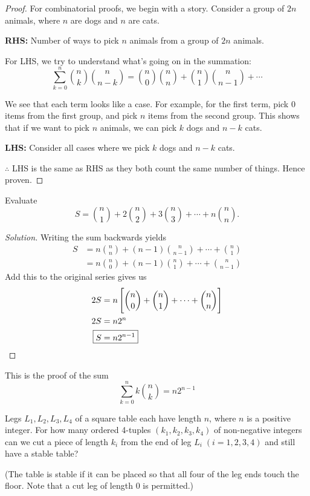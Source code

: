 \begin{proof}
For combinatorial proofs, we begin with a story. Consider a group of $2n$ animals, where $n$ are dogs and $n$ are cats.

\textbf{RHS:} Number of ways to pick $n$ animals from a group of $2n$ animals.

For LHS, we try to understand what's going on in the summation:
\[ \sum_{k=0}^{n} \binom{n}{k}\binom{n}{n-k} = \binom{n}{0}\binom{n}{n} + \binom{n}{1}\binom{n}{n-1} + \cdots \]

We see that each term looks like a case. For example, for the first term, pick $0$ items from the first group, and pick $n$ items from the second group. This shows that if we want to pick $n$ animals, we can pick $k$ dogs and $n-k$ cats.

\textbf{LHS:} Consider all cases where we pick $k$ dogs and $n-k$ cats.

$\therefore$ LHS is the same as RHS as they both count the same number of things. Hence proven.
\end{proof}
\pagebreak

\begin{prbm} 
Evaluate 
\[ S = {n \choose 1} + 2 {n \choose 2} + 3 {n \choose 3} + \cdots + n {n \choose n}. \] 
\end{prbm}

\begin{proof}[Solution]
Writing the sum backwards yields 
\begin{align*} 
S &= n {n \choose n} + (n-1) {n \choose n-1} + \cdots + {n \choose 1} \\&= n {n \choose 0} + (n-1) {n \choose 1} + \cdots + {n \choose n-1} 
\end{align*} 
Add this to the original series gives us 
\begin{align*}
2S &= n \left[{n \choose 0} + {n \choose 1} + \cdots + {n \choose n}\right]\\ 
2S &= n 2^n \\
\Aboxed{S &= n 2^{n-1}}
\end{align*}
\end{proof}
This is the proof of the sum
\[ \sum_{k=0}^{n} k \binom{n}{k} = n 2^{n-1} \]
\pagebreak

\begin{prbm}[USAMO 2005]
Legs $L_1, L_2, L_3, L_4$ of a square table each have length $n$, where $n$ is a positive integer. For how many ordered 4-tuples $(k_1, k_2, k_3, k_4)$ of non-negative integers can we cut a piece of length $k_i$ from the end of leg $L_i \; (i=1,2,3,4)$ and still have a stable table?

(The table is stable if it can be placed so that all four of the leg ends touch the floor. Note that a cut leg of length $0$ is permitted.)
\end{prbm}

